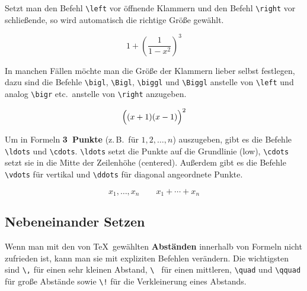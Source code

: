 Setzt man den Befehl \lstinline|\left| vor öffnende Klammern und den
Befehl \lstinline|\right| vor schließende, so wird automatisch die
richtige Größe gewählt.

\begin{LTXexample}
\begin{displaymath}
1 + \left( \frac{1}{ 1-x^{2} }
    \right) ^3
\end{displaymath}
\end{LTXexample}

 
In manchen Fällen möchte man die Größe der Klammern lieber
selbst festlegen, dazu sind die Befehle
\lstinline|\bigl|,
\lstinline|\Bigl|,
\lstinline|\biggl| und
\lstinline|\Biggl| anstelle von \lstinline|\left|
und analog \lstinline|\bigr| etc.\ anstelle von \lstinline|\right|
anzugeben.

\begin{LTXexample}
\begin{displaymath}
\Bigl( (x+1) (x-1) \Bigr) ^{2}
\end{displaymath}
\end{LTXexample}
 
Um in Formeln \textbf{3~Punkte} (z.\,B.\ für \(1,2,\ldots,n\))
auszugeben, gibt es die Befehle
\lstinline|\ldots| und \lstinline|\cdots|.
\lstinline|\ldots| setzt die Punkte auf die Grundlinie (low),
\lstinline|\cdots| setzt sie in die Mitte der Zeilenhöhe
(centered).
Außerdem gibt es die Befehle
\lstinline|\vdots| für vertikal und
\lstinline|\ddots| für diagonal angeordnete Punkte.

\begin{LTXexample}
\begin{displaymath}
x_{1},\ldots,x_{n} \qquad
x_{1}+\cdots+x_{n}
\end{displaymath}
\end{LTXexample}


\subsection{Nebeneinander Setzen}
 
Wenn man mit den von \TeX\ gewählten \textbf{Abständen}
innerhalb von Formeln nicht zufrieden ist, kann man sie mit
expliziten Befehlen verändern. Die wichtigsten sind
\lstinline|\,| für einen sehr kleinen Abstand,
\lstinline|\ | für einen mittleren,
\lstinline|\quad| und \lstinline|\qquad| für große Abstände sowie
\lstinline|\!| für die Verkleinerung eines Abstands.

